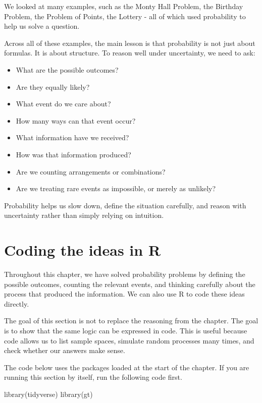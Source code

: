 \documentclass[
  letterpaper,
  DIV=11,
  numbers=noendperiod]{scrreprt}
\newenvironment{Shaded}{\begin{snugshade}}{\end{snugshade}}
\newcommand{\FunctionTok}[1]{\textcolor[rgb]{0.28,0.35,0.67}{#1}}
\newcommand{\NormalTok}[1]{\textcolor[rgb]{0.00,0.23,0.31}{#1}}
\providecommand{\tightlist}{%
  \setlength{\itemsep}{0pt}\setlength{\parskip}{0pt}}
\begin{document}
We looked at many examples, such as the Monty Hall Problem, the Birthday
Problem, the Problem of Points, the Lottery - all of which used
probability to help us solve a question.

Across all of these examples, the main lesson is that probability is not
just about formulas. It is about structure. To reason well under
uncertainty, we need to ask:

\begin{itemize}
\tightlist
\item
  What are the possible outcomes?
\item
  Are they equally likely?
\item
  What event do we care about?
\item
  How many ways can that event occur?
\item
  What information have we received?
\item
  How was that information produced?
\item
  Are we counting arrangements or combinations?
\item
  Are we treating rare events as impossible, or merely as unlikely?
\end{itemize}

Probability helps us slow down, define the situation carefully, and
reason with uncertainty rather than simply relying on intuition.

\section{Coding the ideas in R}\label{coding-the-ideas-in-r-1}

Throughout this chapter, we have solved probability problems by defining
the possible outcomes, counting the relevant events, and thinking
carefully about the process that produced the information. We can also
use R to code these ideas directly.

The goal of this section is not to replace the reasoning from the
chapter. The goal is to show that the same logic can be expressed in
code. This is useful because code allows us to list sample spaces,
simulate random processes many times, and check whether our answers make
sense.

The code below uses the packages loaded at the start of the chapter. If
you are running this section by itself, run the following code first.

\begin{Shaded}
\begin{Highlighting}[]
\FunctionTok{library}\NormalTok{(tidyverse)}
\FunctionTok{library}\NormalTok{(gt)}
\end{Highlighting}
\end{Shaded}
\end{document}
